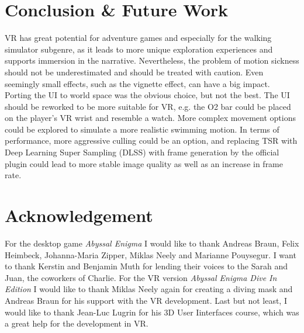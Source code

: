\documentclass[letterpaper, 10 pt, conference]{ieeeconf}  %
\begin{document}
\section{Conclusion \& Future Work}
\label{Sec:ConcFuture}

VR has great potential for adventure games and especially for the walking simulator subgenre, 
as it leads to more unique exploration experiences and supports immersion in the narrative.
Nevertheless, the problem of motion sickness should not be underestimated and should be treated with caution.
Even seemingly small effects, such as the vignette effect, can have a big impact.
Porting the UI to world space was the obvious choice, but not the best.
The UI should be reworked to be more suitable for VR, e.g. the O2 bar could be placed on the player's VR wrist and resemble a watch.
More complex movement options could be explored to simulate a more realistic swimming motion.
In terms of performance, more aggressive culling could be an option, and replacing TSR with Deep Learning Super Sampling (DLSS) with frame generation by the official plugin could lead to more stable image quality as well as an increase in frame rate.

\section*{Acknowledgement}
\label{Sec:Acknowledgement}
For the desktop game \textit{Abyssal Enigma} I would like to thank Andreas Braun, Felix Heimbeck, Johanna-Maria Zipper, Miklas Neely and Marianne Pouysegur.
I want to thank Kerstin and Benjamin Muth for lending their voices to the Sarah and Juan, the coworkers of Charlie.
For the VR version \textit{Abyssal Enigma Dive In Edition} I would like to thank Miklas Neely again for creating a diving mask and Andreas Braun for his support with the VR development.
Last but not least, I would like to thank Jean-Luc Lugrin for his 3D User Iinterfaces course, which was a great help for the development in VR.

\end{document}
